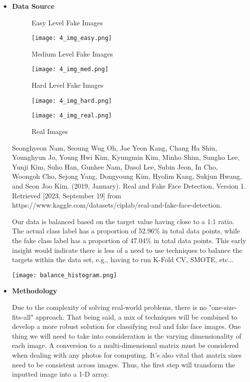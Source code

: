 \documentclass{article}
\begin{document}
\begin{titlepage}
\begin{itemize}
            \item[] \textbf{Data Source}

\begin{figure}[H]
\caption{Easy Level Fake Images}
\centering
\texttt{[image: 4\_img\_easy.png]}
\caption{Medium Level Fake Images}
\centering
\texttt{[image: 4\_img\_med.png]}
\caption{Hard Level Fake Images}
\centering
\texttt{[image: 4\_img\_hard.png]}
\caption{Real Images}
\centering
\texttt{[image: 4\_img\_real.png]}
\end{figure}

            Seonghyeon Nam, Seoung Wug Oh, Jae Yeon Kang, Chang Ha Shin, Younghyun Jo, Young Hwi Kim, Kyungmin Kim, Minho Shim, Sungho Lee, Yunji Kim, Suho Han, Gunhee Nam, Dasol Lee, Subin Jeon, In Cho, Woongoh Cho, Sejong Yang, Dongyoung Kim, Hyolim Kang, Sukjun Hwang, and Seon Joo Kim. (2019, January). Real and Fake Face Detection, Version 1. Retrieved [2023, September 19] from https://www.kaggle.com/datasets/ciplab/real-and-fake-face-detection.

            Our data is balanced based on the target value having close to a 1:1 ratio. The actual class label has a proportion of 52.96\% in total data points, while the fake class label has a proportion of 47.04\% in total data points. This early insight would indicate there is less of a need to use techniques to balance the targets within the data set, e.g., having to run K-Fold CV, SMOTE, etc...

\begin{center}
\texttt{[image: balance\_histogram.png]}
\end{center}


\newpage

            \item[] \textbf{Methodology}


            Due to the complexity of solving real-world problems, there is no "one-size-fits-all" approach. That being said, a mix of techniques will be combined to develop a more robust solution for classifying real and fake face images. One thing we will need to take into consideration is the varying dimensionality of each image. A conversion to a multi-dimensional matrix must be considered when dealing with any photos for computing. It's also vital that matrix sizes need to be consistent across images. Thus, the first step will transform the inputted image into a 1-D array.


\end{itemize}
\end{titlepage}
\end{document}
